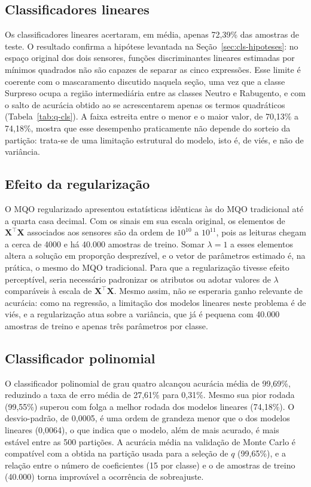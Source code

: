 \documentclass[conference]{IEEEtran}
\begin{document}
\subsection{Classificadores lineares}

Os classificadores lineares acertaram, em média, apenas 72,39\% das amostras
de teste. O resultado confirma a hipótese levantada na
Seção~\ref{sec:cls-hipoteses}: no espaço original dos dois sensores, funções
discriminantes lineares estimadas por mínimos quadrados não são capazes de
separar as cinco expressões. Esse limite é coerente com o mascaramento
discutido naquela seção, uma vez que a classe Surpreso ocupa a região
intermediária entre as classes Neutro e Rabugento, e com o salto de acurácia
obtido ao se acrescentarem apenas os termos quadráticos
(Tabela~\ref{tab:q-cls}). A faixa estreita entre o menor e o maior valor, de
70,13\% a 74,18\%, mostra que esse desempenho praticamente não depende do
sorteio da partição: trata-se de uma limitação estrutural do modelo, isto é, de
viés, e não de variância.

\subsection{Efeito da regularização}

O MQO regularizado apresentou estatísticas idênticas às do MQO tradicional até
a quarta casa decimal. Com os sinais em sua escala original, os elementos de
$\mathbf{X}^{\top}\mathbf{X}$ associados aos sensores são da ordem de $10^{10}$
a $10^{11}$, pois as leituras chegam a cerca de 4000 e há 40.000 amostras de
treino. Somar $\lambda = 1$ a esses elementos altera a solução em proporção
desprezível, e o vetor de parâmetros estimado é, na prática, o mesmo do MQO
tradicional. Para que a regularização tivesse efeito perceptível, seria
necessário padronizar os atributos ou adotar valores de $\lambda$ comparáveis à
escala de $\mathbf{X}^{\top}\mathbf{X}$. Mesmo assim, não se esperaria ganho
relevante de acurácia: como na regressão, a limitação dos modelos lineares
neste problema é de viés, e a regularização atua sobre a variância, que já é
pequena com 40.000 amostras de treino e apenas três parâmetros por classe.

\subsection{Classificador polinomial}

O classificador polinomial de grau quatro alcançou acurácia média de 99,69\%,
reduzindo a taxa de erro média de 27,61\% para 0,31\%. Mesmo sua pior rodada
(99,55\%) superou com folga a melhor rodada dos modelos lineares (74,18\%). O
desvio-padrão, de 0,0005, é uma ordem de grandeza menor que o dos modelos
lineares (0,0064), o que indica que o modelo, além de mais acurado, é mais
estável entre as 500 partições. A acurácia média na validação de Monte Carlo é
compatível com a obtida na partição usada para a seleção de $q$ (99,65\%), e a
relação entre o número de coeficientes (15 por classe) e o de amostras de
treino (40.000) torna improvável a ocorrência de sobreajuste.
\end{document}
